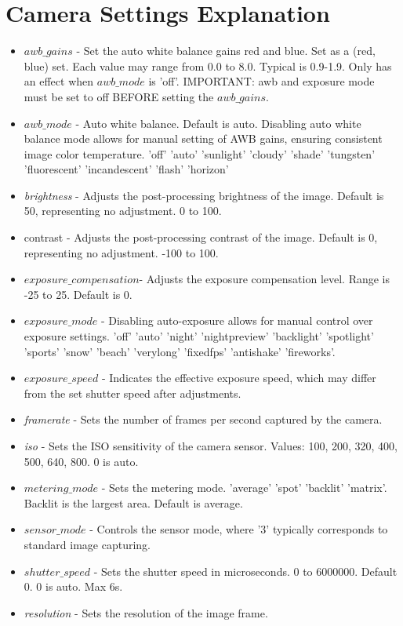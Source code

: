\section{Camera Settings Explanation}
\label{app:camera_settings_explanation}
\begin{itemize}
	\item $awb\_gains$ - Set the auto white balance gains red and blue. Set as a (red, blue) set. Each value may range from 0.0 to 8.0. Typical is 0.9-1.9. Only has an effect when $awb\_mode$ is 'off'. IMPORTANT: awb and exposure mode must be set to off BEFORE setting the $awb\_gains$.
	\item $awb\_mode$ - Auto white balance. Default is auto. Disabling auto white balance mode allows for manual setting of AWB gains, ensuring consistent image color temperature. 'off' 'auto' 'sunlight' 'cloudy' 'shade' 'tungsten' 'fluorescent' 'incandescent' 'flash' 'horizon'
	\item \textit{brightness} - Adjusts the post-processing brightness of the image. Default is 50, representing no adjustment. 0 to 100.
	\item contrast - Adjusts the post-processing contrast of the image. Default is 0, representing no adjustment. -100 to 100.
	\item $exposure\_compensation$- Adjusts the exposure compensation level. Range is -25 to 25. Default is 0.
	\item $exposure\_mode$ - Disabling auto-exposure allows for manual control over exposure settings. 'off' 'auto' 'night' 'nightpreview' 'backlight' 'spotlight' 'sports' 'snow' 'beach' 'verylong' 'fixedfps' 'antishake' 'fireworks'.
	\item $exposure\_speed$ - Indicates the effective exposure speed, which may differ from the set shutter speed after adjustments.
	\item \textit{framerate} - Sets the number of frames per second captured by the camera.
	\item \textit{iso} - Sets the ISO sensitivity of the camera sensor. Values: 100, 200, 320, 400, 500, 640, 800. 0 is auto.
	\item $metering\_mode$ - Sets the metering mode. 'average' 'spot' 'backlit' 'matrix'. Backlit is the largest area. Default is average.
	\item $sensor\_mode$ - Controls the sensor mode, where '3' typically corresponds to standard image capturing.
	\item $shutter\_speed$ - Sets the shutter speed in microseconds. 0 to 6000000. Default 0. 0 is auto. Max 6s.
	\item \textit{resolution} - Sets the resolution of the image frame.
\end{itemize}

